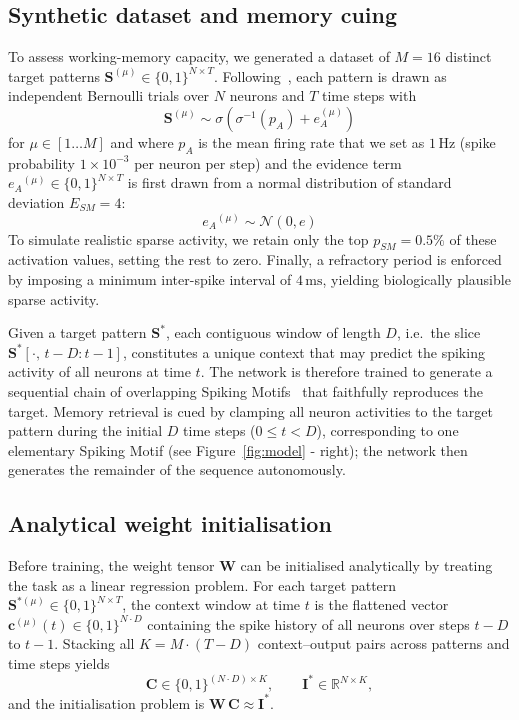 \documentclass{article}
\begin{document}
\subsection{Synthetic dataset and memory cuing}

To assess working-memory capacity, we generated a dataset of $M = 16$ distinct target patterns $\mathbf{S}^{(\mu)} \in \{0,1\}^{N \times T}$. Following~\citet{Perrinet2023}, each pattern is drawn as independent Bernoulli trials over $N$ neurons and $T$ time steps with 
\[
  \mathbf{S}^{(\mu)} \sim  \sigma( \sigma^{-1}(p_A) + e_A^{(\mu)} )
\]
for $\mu \in [1 \ldots M]$ and where $p_A$ is the mean firing rate that we set as $1\,\mathrm{Hz}$ (spike probability $1\times10^{-3}$ per neuron per step) and the evidence term ${e_A}^{(\mu)} \in \{0,1\}^{N \times T}$ is first drawn from a normal distribution of standard deviation $E_{SM}=4$:
\[
  {e_A}^{(\mu)} \sim \mathcal{N}(0, e) 
\]
To simulate realistic sparse activity, we retain only the top $p_{SM} = 0.5\% $ of these activation values, setting the rest to zero. Finally, a refractory period is enforced by imposing a minimum inter-spike interval of $4\,\mathrm{ms}$, yielding biologically plausible sparse activity.

Given a target pattern $\mathbf{S}^*$, each contiguous window of length $D$, i.e.\ the slice $\mathbf{S}^*[\cdot,\, t{-}D:t{-}1]$, constitutes a unique context that may predict the spiking activity of all neurons at time $t$. The network is therefore trained to generate a sequential chain of overlapping Spiking Motifs~\citep{Perrinet2023,Kronland-Martinet2025} that faithfully reproduces the target. Memory retrieval is cued by clamping all neuron activities to the target pattern during the initial $D$ time steps ($0 \le t < D$), corresponding to one elementary Spiking Motif (see Figure~\ref{fig:model} - right); the network then generates the remainder of the sequence autonomously.

\subsection{Analytical weight initialisation}
Before training, the weight tensor $\mathbf{W}$ can be initialised analytically by treating the task as a linear regression problem. For each target pattern $\mathbf{S}^{*(\mu)} \in \{0,1\}^{N \times T}$, the context window at time $t$ is the flattened vector $\mathbf{c}^{(\mu)}(t) \in \{0,1\}^{N \cdot D}$ containing the spike history of all neurons over steps $t-D$ to $t-1$. Stacking all $K = M \cdot (T-D)$ context--output pairs across patterns and time steps yields
\[
  \mathbf{C} \in \{0,1\}^{(N \cdot D) \times K},
  \qquad
  \mathbf{I}^* \in \mathbb{R}^{N \times K},
\]
and the initialisation problem is $\mathbf{W}\,\mathbf{C} \approx \mathbf{I}^*$.
 
\end{document}
